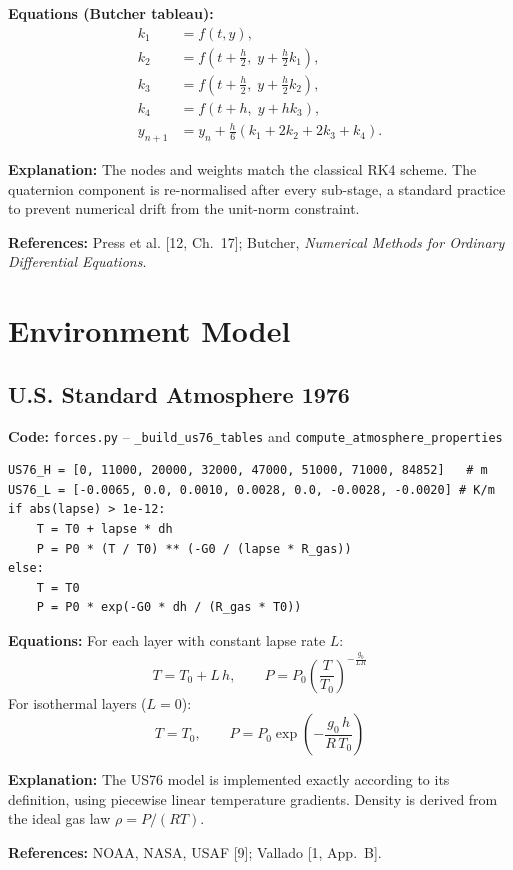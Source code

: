 \documentclass[12pt,a4paper]{article}
\begin{document}
\textbf{Equations (Butcher tableau):}
\[
\begin{aligned}
k_1 &= f(t, y), \\
k_2 &= f(t + \tfrac{h}{2},\; y + \tfrac{h}{2}k_1), \\
k_3 &= f(t + \tfrac{h}{2},\; y + \tfrac{h}{2}k_2), \\
k_4 &= f(t + h,\; y + h k_3), \\
y_{n+1} &= y_n + \frac{h}{6}(k_1 + 2k_2 + 2k_3 + k_4).
\end{aligned}
\]

\textbf{Explanation:} The nodes and weights match the classical RK4 scheme. The quaternion component is re-normalised after every sub-stage, a standard practice to prevent numerical drift from the unit-norm constraint.

\textbf{References:} Press et al. [12, Ch.~17]; Butcher, \textit{Numerical Methods for Ordinary Differential Equations}.

\section{Environment Model}

\subsection{U.S. Standard Atmosphere 1976}

\textbf{Code:} \texttt{forces.py} – \texttt{\_build\_us76\_tables} and \texttt{compute\_atmosphere\_properties}
\begin{verbatim}
US76_H = [0, 11000, 20000, 32000, 47000, 51000, 71000, 84852]   # m
US76_L = [-0.0065, 0.0, 0.0010, 0.0028, 0.0, -0.0028, -0.0020] # K/m
if abs(lapse) > 1e-12:
    T = T0 + lapse * dh
    P = P0 * (T / T0) ** (-G0 / (lapse * R_gas))
else:
    T = T0
    P = P0 * exp(-G0 * dh / (R_gas * T0))
\end{verbatim}

\textbf{Equations:} For each layer with constant lapse rate $L$:
\[
T = T_0 + L\,h,\qquad P = P_0\left(\frac{T}{T_0}\right)^{-\frac{g_0}{L R}}
\]
For isothermal layers ($L=0$):
\[
T = T_0,\qquad P = P_0 \exp\left(-\frac{g_0\,h}{R\,T_0}\right)
\]

\textbf{Explanation:} The US76 model is implemented exactly according to its definition, using piecewise linear temperature gradients. Density is derived from the ideal gas law $\rho = P/(R T)$.

\textbf{References:} NOAA, NASA, USAF [9]; Vallado [1, App.~B].
\end{document}

